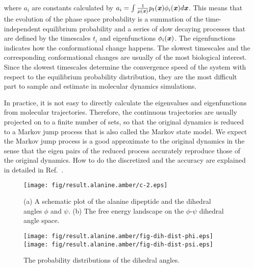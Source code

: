 \documentclass[aip,jcp,a4paper,reprint,unsortedaddress,onecolumn,fleqn]{revtex4-1}
\newcommand{\vect}[1]{\textbf{\textit{#1}}}
\begin{document}
where $a_i$ are constants calculated by $a_i = \int \frac{1}{\mu(\vect
  x)} p_t(\vect x)\phi_i(\vect x) d\vect x$. This means that the
evolution of the phase space probability is a summation of the
time-independent equilibrium probability and a series of slow decaying
processes that are defined by the timescales $t_i$ and eigenfunctions
$\phi_i(\vect x)$. The eigenfunctions indicates how the conformational
change happens.
The slowest timescales and the corresponding conformational
changes are usually of the most biological interest.  Since the
slowest timescales determine the convergence speed of the system with
respect to the equilibrium probability distribution, they are the most
difficult part to sample and estimate in molecular dynamics
simulations.

In practice, it is not easy to directly calculate the eigenvalues and
eigenfunctions from molecular trajectories. Therefore, the continuous
trajectories are usually projected on to a finite number of sets, so
that the original dynamics is reduced to a Markov jump process that is
also called the Markov state model. We expect the Markov jump process
is a good approximate to the original dynamics in the sense that the
eigen pairs of the reduced process accurately reproduce those of the
original dynamics. How to do the discretized and the accuracy are
explained in detailed in Ref.~\cite{prinz2011markov}.

\begin{figure}
  \centering  
  \texttt{[image: fig/result.alanine.amber/c-2.eps]}
  \caption{(a) A schematic plot of the alanine dipeptide and the
    dihedral angles $\phi$ and $\psi$. (b) The free energy landscape on the
    $\phi$-$\psi$ dihedral angle space.}
  \label{fig:free-energy}
\end{figure}

\begin{figure}
  \centering
  \texttt{[image: fig/result.alanine.amber/fig-dih-dist-phi.eps]}\\
  \texttt{[image: fig/result.alanine.amber/fig-dih-dist-psi.eps]}
  \caption{The probability distributions of the dihedral angles.}
  \label{fig:dih-dist}
\end{figure}
\end{document}
